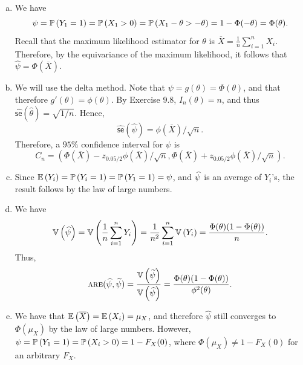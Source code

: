 \begin{ex}~
  \begin{enumerate}[(a)]
    \item We have
          \[
            \psi=\P{Y_1=1}=\P{X_1>0}=\P{X_1-\theta>-\theta}=1-\Phi(-\theta)
            =\Phi(\theta).
          \]
          Recall that the maximum likelihood estimator for $\theta$ is
          $\overline{X}=\frac{1}{n}\sum_{i=1}^nX_i$. Therefore, by the
          equivariance of the maximum likelihood, it follows that
          $\widehat{\psi}=\Phi(\overline{X})$.
    \item We will use the delta method. Note that
          $\psi=g(\theta)=\Phi(\theta)$, and that therefore
          $g'(\theta)=\phi(\theta)$. By Exercise 9.8, $I_n(\theta)=n$, and
          thus $\widehat{\textsf{se}}(\widehat{\theta})=\sqrt{1/n}$. Hence,
          \[
            \widehat{\textsf{se}}(\widehat{\psi})=\phi(\overline{X})/\sqrt{n}.
          \]
          Therefore, a $95\%$ confidence interval for $\psi$ is
          \[
            C_n=\left(
            \Phi(\overline{X})-z_{0.05/2}\phi(\overline{X})/\sqrt{n},
            \Phi(\overline{X})+z_{0.05/2}\phi(\overline{X})/\sqrt{n}
            \right).
          \]
    \item Since $\E{Y_i}=\P{Y_i=1}=\P{Y_1=1}=\psi$, and $\psihat$ is an
          average of $Y_i$'s, the result follows by the law of large numbers.
    \item We have
          \[
            \var{\psihat}
            =\var{\frac{1}{n}\sum_{i=1}^n Y_i}
            =\frac{1}{n^2}\sum_{i=1}^n \var{Y_i}
            =\frac{\Phi(\theta)(1-\Phi(\theta))}{n}.
          \]
          Thus,
          \[
            \textsc{are}(\widehat{\psi},\widetilde{\psi})
            =
            \frac{\var{\widetilde{\psi}}}{\var{\widehat{\psi}}}
            =\frac{\Phi(\theta)(1-\Phi(\theta))}{\phi^2(\theta)}.
          \]
    \item We have that $\E{\overline{X}}=\E{X_i}=\mu_X$, and therefore
          $\widehat{\psi}$ still converges to $\Phi(\mu_X)$ by
          the law of large numbers. However, $\psi=\P{Y_1=1}=
            \P{X_i>0}=1-F_X(0)$, where
          $\Phi(\mu_X)\neq 1-F_X(0)$ for an arbitrary $F_X$.
  \end{enumerate}
\end{ex}

